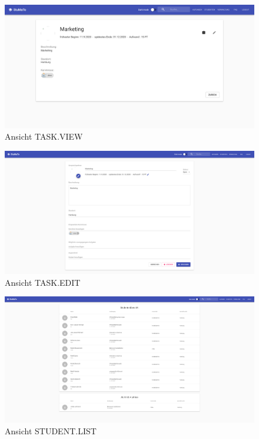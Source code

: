 \documentclass[
  12pt,
  ngerman,
  a4paper,
]{article}
\begin{document}
\begin{figure}
\centering
\includegraphics{./tex2pdf.-930e6666e1221838/7908951722dfee3f634678faf93fa21ee7f6c477.png}
\caption{Ansicht TASK.VIEW}
\end{figure}

\begin{figure}
\centering
\includegraphics{./tex2pdf.-930e6666e1221838/1526445399f73b404890c7f4a0cca5189b06eb12.png}
\caption{Ansicht TASK.EDIT}
\end{figure}

\begin{figure}
\centering
\includegraphics{./tex2pdf.-930e6666e1221838/14347ebd1a68ae90215eaa0204da9facc81485bd.png}
\caption{Ansicht STUDENT.LIST}
\end{figure}
\end{document}
